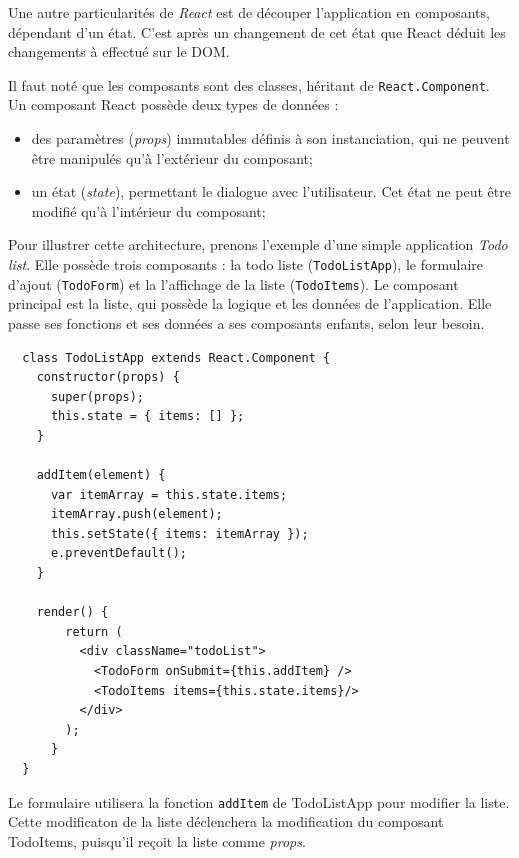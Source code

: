 \documentclass[12pt,a4paper]{article}
\providecommand{\tightlist}{%
  \setlength{\itemsep}{0pt}\setlength{\parskip}{0pt}}
\begin{document}
  \bigskip

  Une autre particularités de \emph{React} est de découper l'application
  en composants, dépendant d'un état. C'est après un changement de cet
  état que React déduit les changements à effectué sur le DOM.

  \bigskip

  Il faut noté que les composants sont des classes, héritant de
  \texttt{React.Component}. Un composant React possède deux types de
  données :

  \begin{itemize}
  \tightlist
  \item
    des paramètres (\emph{props}) immutables définis à son instanciation,
    qui ne peuvent être manipulés qu'à l'extérieur du composant;
  \item
    un état (\emph{state}), permettant le dialogue avec l'utilisateur. Cet
    état ne peut être modifié qu'à l'intérieur du composant;
  \end{itemize}

  \bigskip

  Pour illustrer cette architecture, prenons l'exemple d'une simple
  application \emph{Todo list}. Elle possède trois composants : la todo
  liste (\texttt{TodoListApp}), le formulaire d'ajout (\texttt{TodoForm})
  et la l'affichage de la liste (\texttt{TodoItems}). Le composant
  principal est la liste, qui possède la logique et les données de
  l'application. Elle passe ses fonctions et ses données a ses composants
  enfants, selon leur besoin.

  \begin{verbatim}
  class TodoListApp extends React.Component {
    constructor(props) {
      super(props);
      this.state = { items: [] };
    }

    addItem(element) {
      var itemArray = this.state.items;
      itemArray.push(element);
      this.setState({ items: itemArray });
      e.preventDefault();
    }

    render() {
        return (
          <div className="todoList">
            <TodoForm onSubmit={this.addItem} />
            <TodoItems items={this.state.items}/>
          </div>
        );
      }
  }
  \end{verbatim}

  Le formulaire utilisera la fonction \texttt{addItem} de TodoListApp pour
  modifier la liste. Cette modificaton de la liste déclenchera la
  modification du composant TodoItems, puisqu'il reçoit la liste comme
  \emph{props}.
\end{document}

